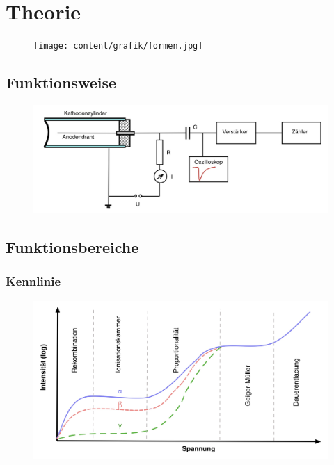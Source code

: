 \section{Theorie}
\label{sec:theorie}

\begin{figure}[H]
	\centering
	\texttt{[image: content/grafik/formen.jpg]}
	\caption{}
	\label{fig:formen}
\end{figure}

\subsection{Funktionsweise}

\begin{figure}[H]
	\centering
	\includegraphics[width=0.9\linewidth]{content/grafik/diagramm.jpg}
	\caption{}
	\label{fig:diagramm}
\end{figure}

\subsection{Funktionsbereiche}

\subsubsection{Kennlinie}

\begin{figure}[H]
	\centering
	\includegraphics[width=0.9\linewidth]{content/grafik/kurve.jpg}
	\caption{}
	\label{fig:kurve}
\end{figure}

